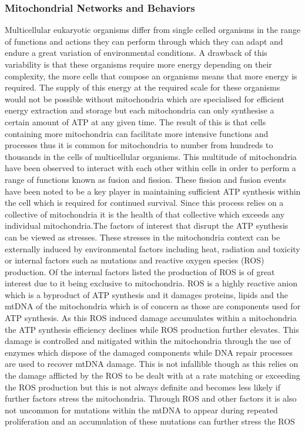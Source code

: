 \subsubsection{Mitochondrial Networks and Behaviors} \label{sec:MitoNet}
Multicellular eukaryotic organisms differ from single celled organisms in the range of functions and actions they can perform through which they can adapt and endure a great variation of environmental conditions. A drawback of this variability is that these organisms require more energy depending on their complexity, the more cells that compose an organisms means that more energy is required. The supply of this energy at the required scale for these organisms would not be possible without mitochondria which are specialised for efficient energy extraction and storage but each mitochondria can only synthesise a certain amount of ATP at any given time. The result of this is that cells containing more mitochondria can facilitate more intensive functions and processes thus it is common for mitochondria to number from hundreds to thousands in the cells of multicellular organisms.\cite{introPhys-2013} This multitude of mitochondria have been observed to interact with each other within cells in order to perform a range of functions known as fusion and fission. These fission and fusion events have been noted to be a key player in maintaining sufficient ATP synthesis within the cell which is required for continued survival. Since this process relies on a collective of mitochondria it is the health of that collective which exceeds any individual mitochondria.\newline\newline The factors of interest that disrupt the ATP synthesis can be viewed as stresses. These stresses in the mitochondria context can be externally induced by environmental factors including heat, radiation and toxicity or internal factors such as mutations and reactive oxygen species (ROS) production. Of the internal factors listed the production of ROS is of great interest due to it being exclusive to mitochondria. ROS is a highly reactive anion which is a byproduct of ATP synthesis and it damages proteins, lipids and the mtDNA of the mitochondria which is of concern as those are components used for ATP synthesis. As this ROS induced damage accumulates within a mitochondria the ATP synthesis efficiency declines while ROS production further elevates. This damage is controlled and mitigated within the mitochondria through the use of enzymes which dispose of the damaged components while DNA repair processes are used to recover mtDNA damage. This is not infallible though as this relies on the damage afflicted by the ROS to be dealt with at a rate matching or exceeding the ROS production but this is not always definite and becomes less likely if further factors stress the mitochondria. Through ROS and other factors it is also not uncommon for mutations within the mtDNA to appear during repeated proliferation and an accumulation of these mutations can further stress the ROS 